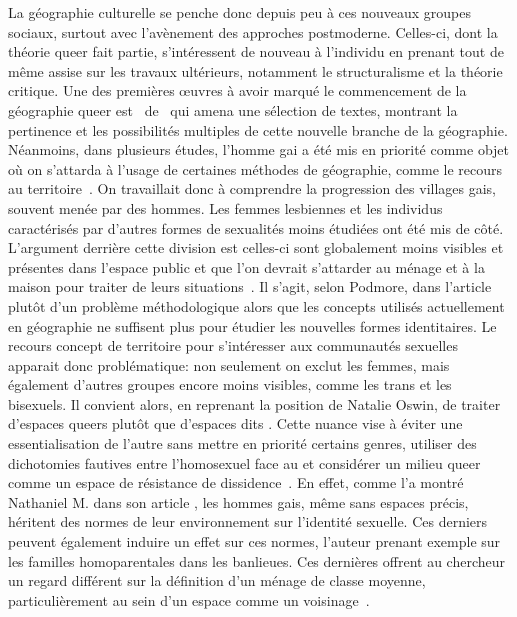 La géographie culturelle se penche donc depuis peu à ces nouveaux groupes sociaux, surtout avec l'avènement des approches postmoderne.
Celles-ci, dont la théorie queer fait partie, s'intéressent de nouveau à l'individu en prenant tout de même assise sur les travaux ultérieurs, notamment le structuralisme et la théorie critique.
Une des premières œuvres à avoir marqué le commencement de la géographie queer est~ de~\citet{Bell1995b} qui amena une sélection de textes, montrant la pertinence et les possibilités multiples de cette nouvelle branche de la géographie.
Néanmoins, dans plusieurs études, l'homme gai a été mis en priorité comme objet où on s'attarda à l'usage de certaines méthodes de géographie, comme le recours au territoire~\citep{Podmore2001,Oswin2008}.
On travaillait donc à comprendre la progression des villages gais, souvent menée par des hommes.
Les femmes lesbiennes et les individus caractérisés par d'autres formes de sexualités moins étudiées ont été mis de côté.
L'argument derrière cette division est celles-ci sont globalement moins visibles et présentes dans l'espace public et que l'on devrait s'attarder au ménage et à la maison pour traiter de leurs situations~\citep[333-334]{Podmore2001}.
Il s'agit, selon Podmore, dans l'article  plutôt d'un problème méthodologique alors que les concepts utilisés actuellement en géographie ne suffisent plus pour étudier les nouvelles formes identitaires.
Le recours concept de territoire pour s'intéresser aux communautés sexuelles apparait donc problématique: non seulement on exclut les femmes, mais également d'autres groupes encore moins visibles, comme les trans et les bisexuels.
Il convient alors, en reprenant la position de Natalie Oswin, de traiter d'espaces queers plutôt que d'espaces dits \lgbt.
Cette nuance vise à éviter une essentialisation de l'autre sans mettre en priorité certains genres, utiliser des dichotomies fautives entre l'homosexuel face au  et considérer  un milieu queer comme un espace de résistance de dissidence~\citep{Oswin2008}.
En effet, comme l'a montré Nathaniel M. \citet{Lewis2011} dans son article , les hommes gais, même sans espaces précis, héritent des normes de leur environnement sur l'identité sexuelle.
Ces derniers peuvent également induire un effet sur ces normes, l'auteur prenant exemple sur les familles homoparentales dans les banlieues.
Ces dernières offrent au chercheur un regard différent sur la définition d'un ménage de classe moyenne, particulièrement au sein d'un espace comme un voisinage~\citep[304]{Lewis2011}.

